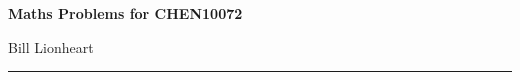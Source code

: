 \begin{center} 
{\bf Maths Problems for  CHEN10072 \\

 Bill Lionheart
}
\end{center}
\hrule
\smallskip
